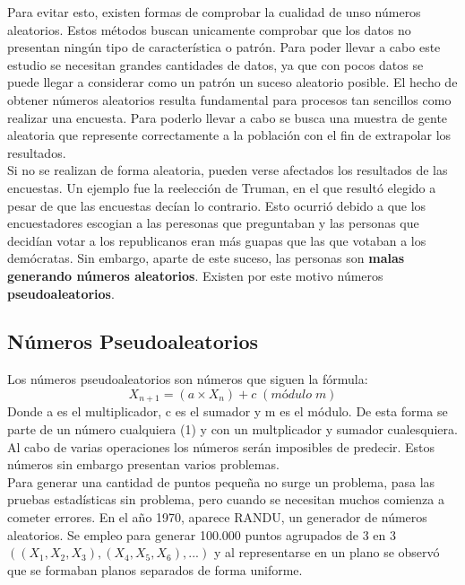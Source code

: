 \documentclass[11pt]{article}
\theoremstyle{plain}
\begin{document}
        Para evitar esto, existen formas de comprobar la cualidad de unso números aleatorios. Estos métodos buscan unicamente comprobar que los datos no presentan ningún tipo de característica o patrón. Para poder llevar a cabo este estudio se necesitan grandes cantidades de datos, ya que con pocos datos se puede llegar a considerar como un patrón un suceso aleatorio posible. El hecho de obtener números aleatorios resulta fundamental para procesos tan sencillos como realizar una encuesta. Para poderlo llevar a cabo se busca una muestra de gente aleatoria que represente correctamente a la población con el fin de extrapolar los resultados.\\

        Si no se realizan de forma aleatoria, pueden verse afectados los resultados de las encuestas. Un ejemplo fue la reelección de Truman, en el que resultó elegido a pesar de que las encuestas decían lo contrario. Esto ocurrió debido a que los encuestadores escogian a las peresonas que preguntaban y las personas que decidían votar a los republicanos eran más guapas que las que votaban a los demócratas. Sin embargo, aparte de este suceso, las personas son \textbf{malas generando números aleatorios}. Existen por este motivo números \textbf{pseudoaleatorios}.

        \subsection{Números Pseudoaleatorios} %
        \label{sub:números_pseudoaleatorios}
            Los números pseudoaleatorios son números que siguen la fórmula:
            \begin{equation}
                X_{n+1} = (a \times X_n) + c \; (módulo \; m)
            \end{equation}
            Donde a es el multiplicador, c es el sumador y m es el módulo. De esta forma se parte de un número cualquiera (1) y con un multplicador y sumador cualesquiera. Al cabo de varias operaciones los números serán imposibles de predecir. Estos números sin embargo presentan varios problemas.\\

            Para generar una cantidad de puntos pequeña no surge un problema, pasa las pruebas estadísticas sin problema, pero cuando se necesitan muchos comienza a cometer errores. En el año 1970, aparece RANDU, un generador de números aleatorios. Se empleo para generar 100.000 puntos agrupados de 3 en 3 $((X_1,X_2,X_3),(X_4,X_5,X_6),...)$ y al representarse en un plano se observó que se formaban planos separados de forma uniforme.
\end{document}
